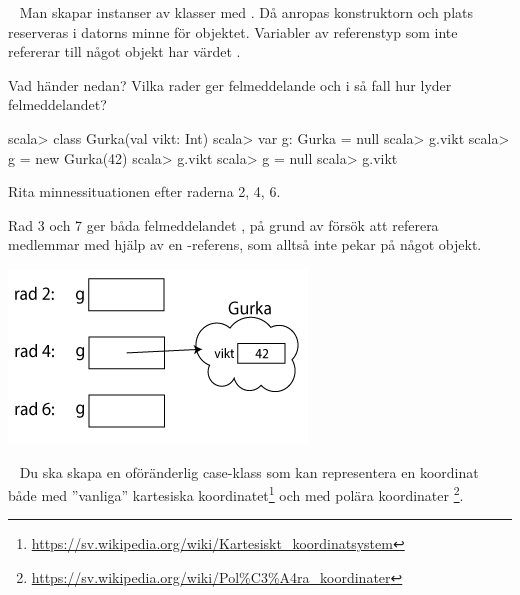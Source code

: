 \QUESTEND






\ExtraTasks %



\QUESTBEGIN

\Task  \what~  Man skapar instanser av klasser med . Då anropas konstruktorn och plats reserveras i datorns minne för objektet. Variabler av referenstyp som inte refererar till något objekt har värdet .

\Subtask Vad händer nedan? Vilka rader ger felmeddelande och i så fall hur lyder felmeddelandet?

\begin{REPL}
scala> class Gurka(val vikt: Int)
scala> var g: Gurka = null
scala> g.vikt
scala> g = new Gurka(42)
scala> g.vikt
scala> g = null
scala> g.vikt
\end{REPL}

\Subtask Rita minnessituationen efter raderna 2, 4, 6.

\SOLUTION


\TaskSolved \what


\SubtaskSolved  Rad 3 och 7 ger båda felmeddelandet ,  på grund av försök att referera medlemmar med hjälp av en -referens, som alltså inte pekar på något objekt.

\SubtaskSolved  \includegraphics[scale=0.6]{../img/w06-solutions/1b}


\QUESTEND




\QUESTBEGIN

\Task \what~
Du ska skapa en oföränderlig case-klass  som kan representera en koordinat både med ''vanliga'' kartesiska koordinatet\footnote{\url{https://sv.wikipedia.org/wiki/Kartesiskt_koordinatsystem}} och med polära koordinater%
\footnote{\url{https://sv.wikipedia.org/wiki/Pol\%C3\%A4ra\_koordinater}}.

